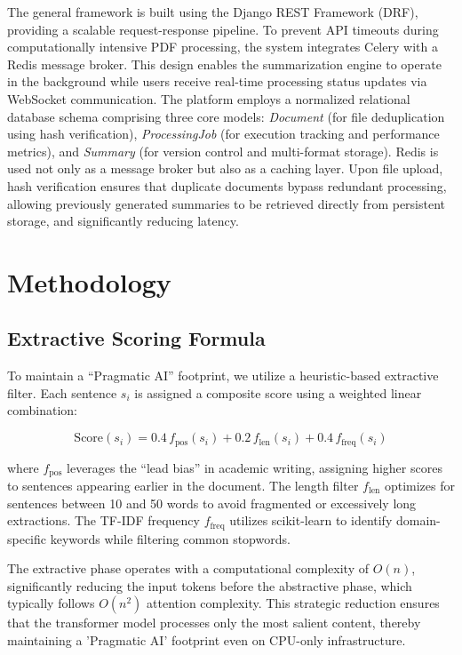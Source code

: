 \documentclass[conference]{IEEEtran}
\begin{document}
The general framework is built using the Django REST Framework (DRF), providing a scalable request-response pipeline. To prevent API timeouts during computationally intensive PDF processing, the system integrates Celery with a Redis message broker. This design enables the summarization engine to operate in the background while users receive real-time processing status updates via WebSocket communication. The platform employs a normalized relational database schema comprising three core models: \textit{Document} (for file deduplication using hash verification), \textit{ProcessingJob} (for execution tracking and performance metrics), and \textit{Summary} (for version control and multi-format storage). Redis is used not only as a message broker but also as a caching layer. Upon file upload, hash verification ensures that duplicate documents bypass redundant processing, allowing previously generated summaries to be retrieved directly from persistent storage, and significantly reducing latency.

\section{Methodology}

\subsection{Extractive Scoring Formula}

To maintain a ``Pragmatic AI'' footprint, we utilize a heuristic-based extractive filter. Each sentence \(s_i\) is assigned a composite score using a weighted linear combination:

\begin{equation}
\text{Score}(s_i) = 
0.4\,f_{\text{pos}}(s_i) + 
0.2\,f_{\text{len}}(s_i) + 
0.4\,f_{\text{freq}}(s_i)
\label{eq:scoring}
\end{equation}

where \(f_{\text{pos}}\) leverages the ``lead bias'' in academic writing, assigning higher scores to sentences appearing earlier in the document. The length filter \(f_{\text{len}}\) optimizes for sentences between 10 and 50 words to avoid fragmented or excessively long extractions. The TF-IDF frequency \(f_{\text{freq}}\) utilizes scikit-learn to identify domain-specific keywords while filtering common stopwords.

The extractive phase operates with a computational complexity of \(O(n)\), significantly reducing the input tokens before the abstractive phase, which typically follows \(O(n^2)\) attention complexity. This strategic reduction ensures that the transformer model processes only the most salient content, thereby maintaining a 'Pragmatic AI' footprint even on CPU-only infrastructure.
\end{document}
